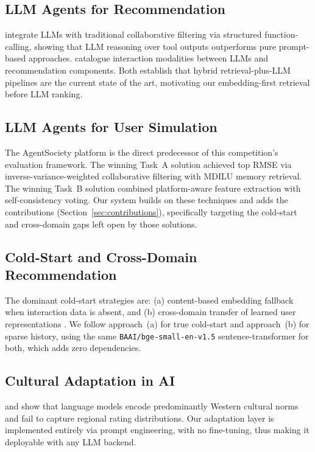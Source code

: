 \documentclass[11pt]{article}
\begin{document}
\subsection{LLM Agents for Recommendation}
\citet{huang2025intrecagent} integrate LLMs with traditional collaborative filtering via structured function-calling, showing that LLM reasoning over tool outputs outperforms pure prompt-based approaches. \citet{lian2024recai} catalogue interaction modalities between LLMs and recommendation components. Both establish that hybrid retrieval-plus-LLM pipelines are the current state of the art, motivating our embedding-first retrieval before LLM ranking.

\subsection{LLM Agents for User Simulation}
The AgentSociety platform \citep{piao2025agentsociety} is the direct predecessor of this competition's evaluation framework. The winning Task~A solution achieved top RMSE via inverse-variance-weighted collaborative filtering with MDILU memory retrieval. The winning Task~B solution combined platform-aware feature extraction with self-consistency voting. Our system builds on these techniques and adds the contributions (Section~\ref{sec:contributions}), specifically targeting the cold-start and cross-domain gaps left open by those solutions.

\subsection{Cold-Start and Cross-Domain Recommendation}
The dominant cold-start strategies are: (a) content-based embedding fallback when interaction data is absent, and (b) cross-domain transfer of learned user representations \citep{yuanchenbei2024coldstart}. We follow approach~(a) for true cold-start and approach~(b) for sparse history, using the same \texttt{BAAI/bge-small-en-v1.5} sentence-transformer for both, which adds zero dependencies.

\subsection{Cultural Adaptation in AI}
\citet{hershcovich2022challenges} and \citet{cao2023assessing} show that language models encode predominantly Western cultural norms and fail to capture regional rating distributions. Our adaptation layer is implemented entirely via prompt engineering, with no fine-tuning, thus making it deployable with any LLM backend.
\end{document}
